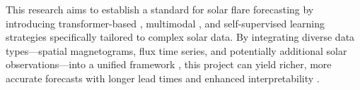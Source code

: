 This research aims to establish a standard for solar flare forecasting by introducing transformer-based \cite{RefWorks:RefID:3-vaswani2023provided,RefWorks:RefID:29-hoffmanntraining}, multimodal \cite{RefWorks:RefID:30-schmude2024prithvi}, and self-supervised learning strategies specifically tailored to complex solar data. By integrating diverse data types—spatial magnetograms, flux time series, and potentially additional solar observations—into a unified framework \cite{RefWorks:RefID:33-francisco2024multimodal,RefWorks:RefID:2-abduallah2023operational}, this project can yield richer, more accurate forecasts with longer lead times and enhanced interpretability \cite{RefWorks:RefID:35-licllmate:}.